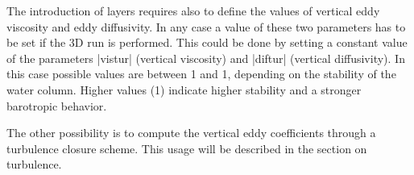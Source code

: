 The introduction of layers requires also to define the values of
vertical eddy viscosity and eddy diffusivity.  In any case a value of
these two parameters has to be set if the 3D run is performed. This
could be done by setting a constant value of the parameters |vistur|
(vertical viscosity) and |diftur| (vertical diffusivity). In this case
possible values are between 1 and 1, depending on the
stability of the water column. Higher values (1) indicate higher
stability and a stronger barotropic behavior.

The other possibility is to compute the vertical eddy coefficients through
a turbulence closure scheme. This usage will be described in the section
on turbulence.

